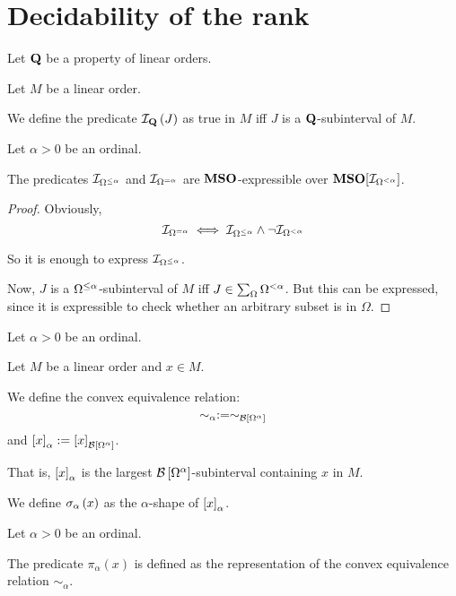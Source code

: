 \section{Decidability of the rank}

\begin{definition}
  Let $\mathbf{Q}$ be a property of linear orders.

  Let $M$ be a linear order.

  We define the predicate $\mathcal{I}_{\mathbf{Q}} \left( {J} \right)$ as
  true in $M$ iff $J$ is a $\mathbf{Q}$-subinterval of $M$.
\end{definition}

\begin{lemma}
  Let $\alpha > 0$ be an ordinal.

  The predicates $\mathcal{I}_{\Omega^{\le \alpha}}$ and $\mathcal{I}_{\Omega^{= \alpha}}$
  are $\mathbf{MSO}$-expressible over $\mathbf{MSO}[\mathcal{I}_{\Omega^{< \alpha}}]$.
\end{lemma}

\begin{proof}
  Obviously, \[
    \mathcal{I}_{\Omega^{= \alpha}}
    \iff \mathcal{I}_{\Omega^{\le \alpha}} \wedge \neg \mathcal{I}_{\Omega^{< \alpha}}
  \]

  So it is enough to express $\mathcal{I}_{\Omega^{\le \alpha}}$.

  Now, $J$ is a $\Omega^{\le \alpha}$-subinterval of $M$ iff
  $J \in \sum_{\Omega}{\Omega^{< \alpha}}$. But this can be expressed, since it is expressible
  to check whether an arbitrary subset is in $\Omega$.
\end{proof}

\begin{definition}
  Let $\alpha > 0$ be an ordinal.

  Let $M$ be a linear order and $x \in M$.

  We define the convex equivalence relation:
  \[\sim_\alpha := \sim_{\mathcal{B} \left[ {{\Omega^{\alpha}}} \right]}\]
  and $\left[ {x} \right]_{\alpha} := \left[ {x} \right]_{\mathcal{B} \left[ {{\Omega^{\alpha}}} \right]}$.

  That is,
  $\left[ {x} \right]_{\alpha}$ is the largest $\mathcal{B} \left[ {{\Omega^{\alpha}}} \right]$-subinterval
  containing $x$ in $M$.

  We define $\sigma_{\alpha} \left( {x} \right)$ as
  the $\alpha$-shape of $\left[ {x} \right]_{\alpha}$.
\end{definition}

\begin{definition}
  Let $\alpha > 0$ be an ordinal.

  The predicate $\pi_{\alpha}(x)$ is defined as the representation of
  the convex equivalence relation $\sim_{\alpha}$.
\end{definition}

